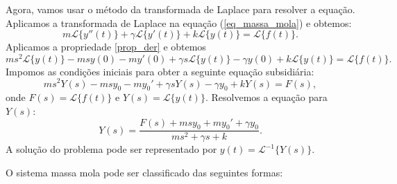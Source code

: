 \documentclass[Main.tex]{subfiles}
\begin{document}
Agora, vamos usar o método da transformada de Laplace para resolver a equação. Aplicamos a transformada de Laplace na equação (\ref{eq_massa_mola}) e obtemos:
$$
m\mathcal{L}\{y''(t)\}+\gamma \mathcal{L}\{y'(t)\}+k\mathcal{L}\{y(t)\}=\mathcal{L}\{f(t)\}.
$$
Aplicamos a propriedade \ref{prop_der} e obtemos
$$
ms^2\mathcal{L}\{y(t)\}-msy(0)-my'(0)+\gamma s\mathcal{L}\{y(t)\}-\gamma y(0)+k\mathcal{L}\{y(t)\}=\mathcal{L}\{f(t)\}.
$$
Impomos as condições iniciais para obter a seguinte equação subsidiária:
$$
ms^2Y(s)-msy_0-my_0'+\gamma sY(s)-\gamma y_0+kY(s)=F(s),
$$
onde $F(s)=\mathcal{L}\{f(t)\}$ e $Y(s)=\mathcal{L}\{y(t)\}$. Resolvemos a equação para $Y(s)$:
$$
Y(s)=\frac{F(s)+msy_0+my_0'+\gamma y_0}{ms^2+\gamma s +k}.
$$
A solução do problema pode ser representado por $y(t)=\mathcal{L}^{-1}\{Y(s)\}$. 

O sistema massa mola pode ser classificado das seguintes formas:
\end{document}
